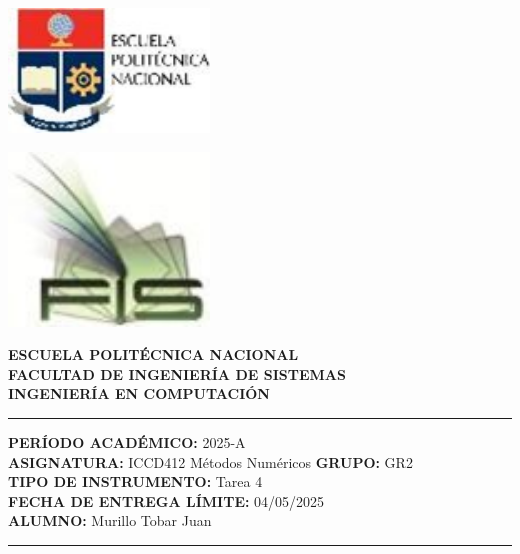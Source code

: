 \documentclass[12pt]{article}
\begin{document}
\begin{minipage}{0.45\textwidth}
    \includegraphics[width=0.4\textwidth]{inFiles/Figures/epnLogo.jpg}
\end{minipage}
\hfill
\begin{minipage}{0.45\textwidth}
    \raggedleft
    \includegraphics[width=0.4\textwidth]{inFiles/Figures/FIS_logo.jpg}
\end{minipage}

\vspace{0.5cm}

\begin{center}
    \textbf{ESCUELA POLITÉCNICA NACIONAL}\\[0.2cm]
    \textbf{FACULTAD DE INGENIERÍA DE SISTEMAS}\\[0.2cm]
    \textbf{INGENIERÍA{\textbf{ EN COMPUTACIÓN}}}
\end{center}

\vspace{0.5cm}
\hrule
\vspace{0.5cm}

\noindent\textbf{PERÍODO ACADÉMICO:} 2025-A\\[0.2cm]
\noindent\textbf{ASIGNATURA:} ICCD412 Métodos Numéricos \hfill \textbf{GRUPO:} GR2\\[0.2cm]
\noindent\textbf{TIPO DE INSTRUMENTO:} Tarea 4\\[0.2cm]
\noindent\textbf{FECHA DE ENTREGA LÍMITE:} 04/05/2025\\[0.2cm]
\noindent\textbf{ALUMNO:} Murillo Tobar Juan 

\vspace{0.5cm}
\hrule
\vspace{1cm}
\end{document}
